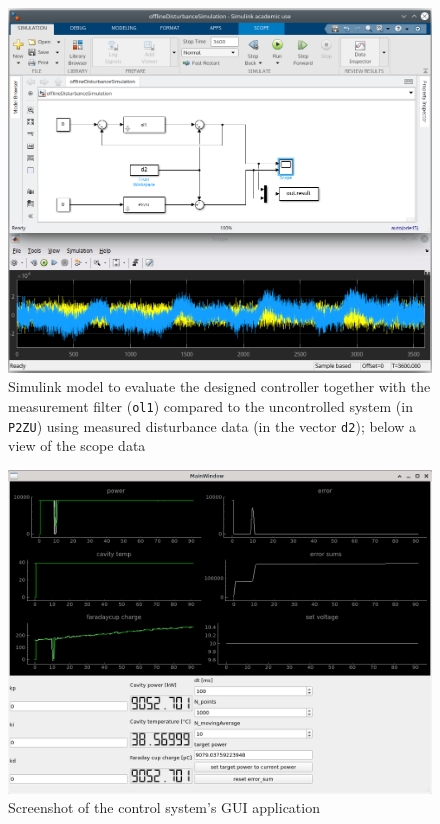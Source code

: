 \begin{figure}[tbh]
	\centering
	\includegraphics[width=\textwidth]{chap/Appendix/ControllerDesign/simulink}
	\caption{Simulink model to evaluate the designed controller together with the measurement filter (\texttt{ol1}) compared to the uncontrolled system (in \texttt{P2ZU}) using measured disturbance data (in the vector \texttt{d2}); below a view of the scope data}
	\label{fig:Appendix-simuliunk}
\end{figure}

\begin{figure}[tbh]
	\centering
	\includegraphics[width=\textwidth]{chap/Appendix/ControllerDesign/qt}
	\caption{Screenshot of the control system's GUI application}
	\label{fig:Appendix-qt}
\end{figure}

